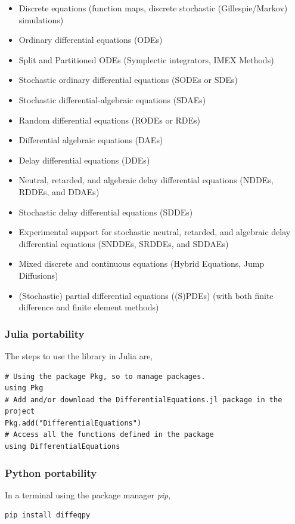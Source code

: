 \documentclass[
12pt,				%
openright,			%
oneside,			%
a4paper,			%
brazil,				%
english,			  %
]{abntex2}
\begin{document}
\begin{itemize}
\item Discrete equations (function maps, discrete stochastic (Gillespie/Markov) simulations)
\item Ordinary differential equations (ODEs)
\item Split and Partitioned ODEs (Symplectic integrators, IMEX Methods)
\item Stochastic ordinary differential equations (SODEs or SDEs)
\item Stochastic differential-algebraic equations (SDAEs)
\item Random differential equations (RODEs or RDEs)
\item Differential algebraic equations (DAEs)
\item Delay differential equations (DDEs)
\item Neutral, retarded, and algebraic delay differential equations (NDDEs, RDDEs, and DDAEs)
\item Stochastic delay differential equations (SDDEs)
\item Experimental support for stochastic neutral, retarded, and algebraic delay differential equations (SNDDEs, SRDDEs, and SDDAEs)
\item Mixed discrete and continuous equations (Hybrid Equations, Jump Diffusions)
\item (Stochastic) partial differential equations ((S)PDEs) (with both finite difference and finite element methods)
\end{itemize}

\subsubsection{Julia portability}

The steps to use the library in Julia are,

\begin{verbatim}
# Using the package Pkg, so to manage packages. 
using Pkg
# Add and/or download the DifferentialEquations.jl package in the project 
Pkg.add("DifferentialEquations")
# Access all the functions defined in the package 
using DifferentialEquations
\end{verbatim}

\subsubsection{Python portability}

In a terminal using the package manager \textit{pip},
\begin{verbatim}
pip install diffeqpy
\end{verbatim}
\end{document}

